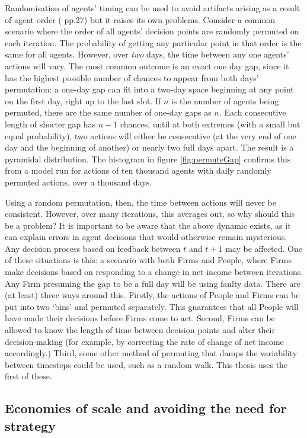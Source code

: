 {Randomisation of agents' timing can be used to avoid artifacts arising as a result of agent order (\citealt{gilbert_agent-based_2007} pp.27) but it raises its own problems. Consider a common scenario where the order of all agents' decision points are randomly permuted on each iteration. The probability of getting any particular point in that order is the same for all agents. However, over \emph{two} days, the time between any one agents' actions will vary. The most common outcome is an exact one day gap, since it has the highest possible number of chances to appear from both days' permutation: a one-day gap can fit into a two-day space beginning at any point on the first day, right up to the last slot. If $n$ is the number of agents being permuted, there are the same number of one-day gaps as $n$. Each consecutive length of shorter gap has $n-1$ chances, until at both extremes (with a small but equal probability), two actions will either be consecutive (at the very end of one day and the beginning of another) or nearly two full days apart. The result is a pyramidal distribution. The histogram in figure \ref{fig:permuteGap} confirms this from a model run for actions of ten thousand agents with daily randomly permuted actions, over a thousand days.


Using a random permutation, then, the time between actions will never be consistent. However, over many iterations, this averages out, so why should this be a problem? It is important to be aware that the above dynamic exists, as it can explain errors in agent decisions that would otherwise remain mysterious. Any decision process based on feedback between $t$ and $t+1$ may be affected. One of these situations is this: a scenario with both Firms and People, where Firms make decisions based on responding to a change in net income between iterations. Any Firm presuming the gap to be a full day will be using faulty data. There are (at least) three ways around this. Firstly, the actions of People and Firms can be put into two `bins' and permuted separately. This guarantees that all People will have made their decisions before Firms come to act. Second, Firms can be allowed to know the length of time between decision points and alter their decision-making (for example, by correcting the rate of change of net income accordingly.) Third, some other method of permuting that damps the variability between timesteps could be used, such as a random walk. This thesis uses the first of these. 

\subsection{Economies of scale and avoiding the need for strategy \label{sec:abmprod}}

}
